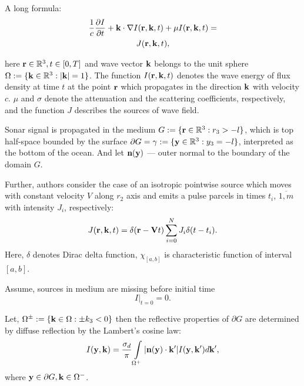 \documentclass{procDDs}
\begin{document}
A long formula:
\begin{multline}
	\label{model}
	\frac{1}{c} \frac{\partial I}{\partial t} + \mathbf{k} \cdot \nabla I(\mathbf{r},\mathbf{k},t) + 
	\mu I(\mathbf{r},\mathbf{k},t) = \\ J(\mathbf{r},\mathbf{k},t),
\end{multline}

here $\mathbf{r} \in \mathbb{R}^3, t \in [0, T]$ and wave vector $\mathbf{k}$ belongs to the unit sphere $\Omega := \{\mathbf{k} \in \mathbb{R}^3: |\mathbf{k}| = 1\}$. The function $I(\mathbf{r},\mathbf{k}, t)$ denotes the wave energy of flux density at time $t$  at the point $\mathbf{r}$ which propagates in the direction $\mathbf{k}$  with velocity $c$. $\mu$ and $\sigma$ denote the attenuation and the scattering coefficients, respectively, and the function $J$ describes the sources of
wave field.

Sonar signal is propagated in the medium $G:=\{\mathbf{r} \in \mathbb{R}^3:r_3 > -l\}$, which is top half-space bounded by the surface $\partial G = \gamma := \{\mathbf{y} \in \mathbb{R}^3: y_3 = -l \}$, interpreted as the bottom of the ocean. And let $\textbf{n}(\mathbf{y})$ --- outer normal to the boundary of the domain $G$. 



Further, authors consider the case of an isotropic pointwise source which moves with constant velocity $V$ along $r_2$ axis and emits a pulse parcels in times $t_i$, $\overline{1,m}$ with intensity $J_i$, respectively: 
\begin{equation}
	\label{source}
	J(\mathbf{r},\mathbf{k}, t) = \delta(\mathbf{r} - \mathbf{V} t)\sum\limits_{i=0}^{N} J_i \delta(t-t_i).
\end{equation}
Here, $\delta$ denotes Dirac delta function, $\chi_{[a,b]}$ is characteristic function of interval $[a,b]$.

Assume, sources in medium are missing before initial time
\begin{equation}
	\label{init_cond}
	I\rvert_{t=0}=0.
\end{equation}

Let, $\Omega^\pm := \{\mathbf{k} \in \Omega: \pm k_3 < 0\}$ then the reflective properties of $\partial G$  are determined by diffuse reflection by the Lambert’s cosine law:
\begin{equation}
	\label{boundary_condition}
	I(\mathbf{y},\mathbf{k}) = \frac{\sigma_d}{\pi} \int\limits_{\Omega ^+}|\mathbf{n}(\mathbf{y})\cdot \mathbf{k}'| I(\mathbf{y},\mathbf{k}') d\mathbf{k}' ,
\end{equation}
where  $\mathbf{y} \in \partial G, \mathbf{k} \in \Omega^-$.
\end{document}

